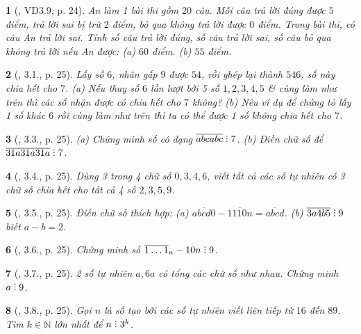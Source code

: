 \documentclass{article}
\newtheorem{baitoan}{}
\DeclareRobustCommand{\divby}{%
	\mathrel{\vbox{\baselineskip.65ex\lineskiplimit0pt\hbox{.}\hbox{.}\hbox{.}}}%
}
\begin{document}
\begin{baitoan}[\cite{TLCT_THCS_Toan_6_so_hoc}, VD3.9, p. 24]
	An làm 1 bài thi gồm $20$ câu. Mỗi câu trả lời đúng được $5$ điểm, trả lời sai bị trừ $2$ điểm, bỏ qua không trả lời được $0$ điểm. Trong bài thi, có câu An trả lời sai. Tính số câu trả lời đúng, số câu trả lời sai, số câu bỏ qua không trả lời nếu An được: (a) $60$ điểm. (b) $55$ điểm.
\end{baitoan}

\begin{baitoan}[\cite{TLCT_THCS_Toan_6_so_hoc}, 3.1., p. 25]
	Lấy số $6$, nhân gấp $9$ được $54$, rồi ghép lại thành $546$, số này chia hết cho $7$. (a) Nếu thay số $6$ lần lượt bởi 5 số $1,2,3,4,5$ \& cùng làm như trên thì các số nhận được có chia hết cho $7$ không? (b) Nêu ví dụ để chứng tỏ lấy 1 số khác $6$ rồi cùng làm như trên thì ta có thể được 1 số không chia hết cho $7$.
\end{baitoan}

\begin{baitoan}[\cite{TLCT_THCS_Toan_6_so_hoc}, 3.3., p. 25]
	(a) Chứng minh số có dạng $\overline{abcabc}\divby7$. (b) Điền chữ số để $\overline{31a31a31a}\divby7$.
\end{baitoan}

\begin{baitoan}[\cite{TLCT_THCS_Toan_6_so_hoc}, 3.4., p. 25]
	Dùng 3 trong 4 chữ số $0,3,4,6$, viết tất cả các số tự nhiên có 3 chữ số chia hết cho tất cả 4 số $2,3,5,9$.
\end{baitoan}

\begin{baitoan}[\cite{TLCT_THCS_Toan_6_so_hoc}, 3.5., p. 25]
	Điền chữ số thích hợp: (a) $\overline{abcd0} - \overline{1110n} = \overline{abcd}$. (b) $\overline{3a4b5}\divby9$ biết $a - b = 2$.
\end{baitoan}

\begin{baitoan}[\cite{TLCT_THCS_Toan_6_so_hoc}, 3.6., p. 25]
	Chứng minh số $\overline{1\ldots1}_n - 10n\divby9$.
\end{baitoan}

\begin{baitoan}[\cite{TLCT_THCS_Toan_6_so_hoc}, 3.7., p. 25]
	2 số tự nhiên $a,6a$ có tổng các chữ số như nhau. Chứng minh $a\divby9$.
\end{baitoan}

\begin{baitoan}[\cite{TLCT_THCS_Toan_6_so_hoc}, 3.8., p. 25]
	Gọi $n$ là số tạo bởi các số tự nhiên viết liên tiếp từ $16$ đến $89$. Tìm $k\in\mathbb{N}$ lớn nhất để $n\divby3^k$.
\end{baitoan}
\end{document}
